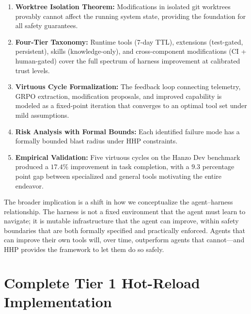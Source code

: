 \documentclass[11pt]{article}
\begin{document}
\begin{enumerate}[leftmargin=1.5em]
    \item \textbf{Worktree Isolation Theorem:} Modifications in isolated git
          worktrees provably cannot affect the running system state, providing
          the foundation for all safety guarantees.
    \item \textbf{Four-Tier Taxonomy:} Runtime tools (7-day TTL), extensions
          (test-gated, persistent), skills (knowledge-only), and cross-component
          modifications (CI + human-gated) cover the full spectrum of harness
          improvement at calibrated trust levels.
    \item \textbf{Virtuous Cycle Formalization:} The feedback loop connecting
          telemetry, GRPO extraction, modification proposals, and improved
          capability is modeled as a fixed-point iteration that converges to an
          optimal tool set under mild assumptions.
    \item \textbf{Risk Analysis with Formal Bounds:} Each identified failure
          mode has a formally bounded blast radius under HHP constraints.
    \item \textbf{Empirical Validation:} Five virtuous cycles on the Hanzo Dev
          benchmark produced a $17.4\%$ improvement in task completion, with a
          $9.3$ percentage point gap between specialized and general tools
          motivating the entire endeavor.
\end{enumerate}

The broader implication is a shift in how we conceptualize the agent--harness
relationship. The harness is not a fixed environment that the agent must learn
to navigate; it is mutable infrastructure that the agent can improve, within
safety boundaries that are both formally specified and practically enforced.
Agents that can improve their own tools will, over time, outperform agents
that cannot---and HHP provides the framework to let them do so safely.

\appendix

\section{Complete Tier 1 Hot-Reload Implementation}
\label{app:tier1}
\end{document}
